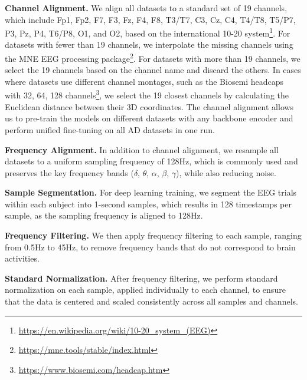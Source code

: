 \textbf{Channel Alignment.} We align all datasets to a standard set of 19 channels, which include Fp1, Fp2, F7, F3, Fz, F4, F8, T3/T7, C3, Cz, C4, T4/T8, T5/P7, P3, Pz, P4, T6/P8, O1, and O2, based on the international 10-20 system\footnote{\url{https://en.wikipedia.org/wiki/10-20_system_(EEG)}}. For datasets with fewer than 19 channels, we interpolate the missing channels using the MNE EEG processing package\footnote{\url{https://mne.tools/stable/index.html}}. For datasets with more than 19 channels, we select the 19 channels based on the channel name and discard the others. In cases where datasets use different channel montages, such as the Biosemi headcaps with 32, 64, 128 channels\footnote{\url{https://www.biosemi.com/headcap.htm}}, we select the 19 closest channels by calculating the Euclidean distance between their 3D coordinates. The channel alignment allows us to pre-train the models on different datasets with any backbone encoder and perform unified fine-tuning on all AD datasets in one run.
 
\textbf{Frequency Alignment.} In addition to channel alignment, we resample all datasets to a uniform sampling frequency of 128Hz, which is commonly used and preserves the key frequency bands ($\delta$, $\theta$, $\alpha$, $\beta$, $\gamma$), while also reducing noise.

\textbf{Sample Segmentation.} For deep learning training, we segment the EEG trials within each subject into 1-second samples, which results in 128 timestamps per sample, as the sampling frequency is aligned to 128Hz. 

\textbf{Frequency Filtering.} We then apply frequency filtering to each sample, ranging from 0.5Hz to 45Hz, to remove frequency bands that do not correspond to brain activities.

\textbf{Standard Normalization.} After frequency filtering, we perform standard normalization on each sample, applied individually to each channel, to ensure that the data is centered and scaled consistently across all samples and channels.




